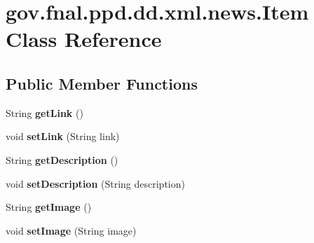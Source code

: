 \hypertarget{classgov_1_1fnal_1_1ppd_1_1dd_1_1xml_1_1news_1_1Item}{\section{gov.\-fnal.\-ppd.\-dd.\-xml.\-news.\-Item Class Reference}
\label{classgov_1_1fnal_1_1ppd_1_1dd_1_1xml_1_1news_1_1Item}
}
\subsection*{Public Member Functions}
\begin{DoxyCompactItemize}
\item 
\hypertarget{classgov_1_1fnal_1_1ppd_1_1dd_1_1xml_1_1news_1_1Item_a2d9ffa5391957f0476919403fbb7bb82}{String {\bfseries get\-Link} ()}\label{classgov_1_1fnal_1_1ppd_1_1dd_1_1xml_1_1news_1_1Item_a2d9ffa5391957f0476919403fbb7bb82}

\item 
\hypertarget{classgov_1_1fnal_1_1ppd_1_1dd_1_1xml_1_1news_1_1Item_a0b038533b517e7d2c1dbffc9844b9539}{void {\bfseries set\-Link} (String link)}\label{classgov_1_1fnal_1_1ppd_1_1dd_1_1xml_1_1news_1_1Item_a0b038533b517e7d2c1dbffc9844b9539}

\item 
\hypertarget{classgov_1_1fnal_1_1ppd_1_1dd_1_1xml_1_1news_1_1Item_a108f0de62782b0e2e6aa52bdb2b46cba}{String {\bfseries get\-Description} ()}\label{classgov_1_1fnal_1_1ppd_1_1dd_1_1xml_1_1news_1_1Item_a108f0de62782b0e2e6aa52bdb2b46cba}

\item 
\hypertarget{classgov_1_1fnal_1_1ppd_1_1dd_1_1xml_1_1news_1_1Item_ad3e40189b7a74762f593c3601f17b7fa}{void {\bfseries set\-Description} (String description)}\label{classgov_1_1fnal_1_1ppd_1_1dd_1_1xml_1_1news_1_1Item_ad3e40189b7a74762f593c3601f17b7fa}

\item 
\hypertarget{classgov_1_1fnal_1_1ppd_1_1dd_1_1xml_1_1news_1_1Item_a2c6863ffcdf6f5d166ba86daea20d852}{String {\bfseries get\-Image} ()}\label{classgov_1_1fnal_1_1ppd_1_1dd_1_1xml_1_1news_1_1Item_a2c6863ffcdf6f5d166ba86daea20d852}

\item 
\hypertarget{classgov_1_1fnal_1_1ppd_1_1dd_1_1xml_1_1news_1_1Item_a0139f388b1cb37202f61f4215ae0f43f}{void {\bfseries set\-Image} (String image)}\label{classgov_1_1fnal_1_1ppd_1_1dd_1_1xml_1_1news_1_1Item_a0139f388b1cb37202f61f4215ae0f43f}


\end{DoxyCompactItemize}
